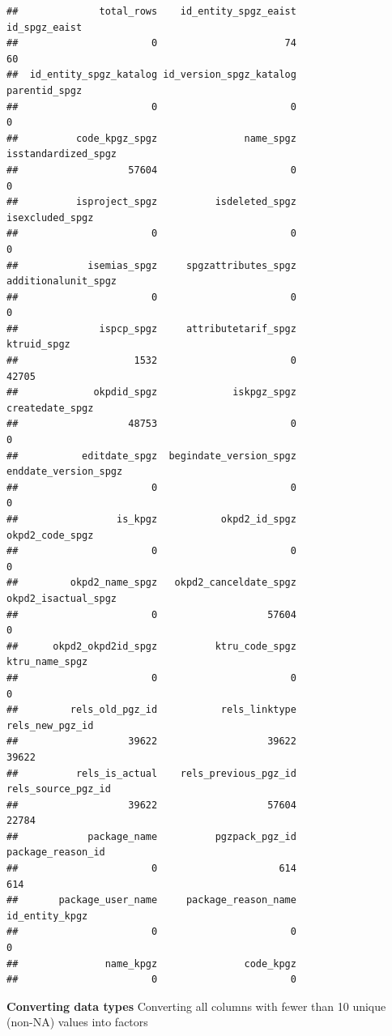 \documentclass[
]{article}
\begin{document}
\begin{verbatim}
##              total_rows    id_entity_spgz_eaist           id_spgz_eaist 
##                       0                      74                      60 
##  id_entity_spgz_katalog id_version_spgz_katalog           parentid_spgz 
##                       0                       0                       0 
##          code_kpgz_spgz               name_spgz     isstandardized_spgz 
##                   57604                       0                       0 
##          isproject_spgz          isdeleted_spgz         isexcluded_spgz 
##                       0                       0                       0 
##            isemias_spgz     spgzattributes_spgz     additionalunit_spgz 
##                       0                       0                       0 
##              ispcp_spgz     attributetarif_spgz             ktruid_spgz 
##                    1532                       0                   42705 
##             okpdid_spgz             iskpgz_spgz         createdate_spgz 
##                   48753                       0                       0 
##           editdate_spgz  begindate_version_spgz    enddate_version_spgz 
##                       0                       0                       0 
##                 is_kpgz           okpd2_id_spgz         okpd2_code_spgz 
##                       0                       0                       0 
##         okpd2_name_spgz   okpd2_canceldate_spgz     okpd2_isactual_spgz 
##                       0                   57604                       0 
##      okpd2_okpd2id_spgz          ktru_code_spgz          ktru_name_spgz 
##                       0                       0                       0 
##         rels_old_pgz_id           rels_linktype         rels_new_pgz_id 
##                   39622                   39622                   39622 
##          rels_is_actual    rels_previous_pgz_id      rels_source_pgz_id 
##                   39622                   57604                   22784 
##            package_name          pgzpack_pgz_id       package_reason_id 
##                       0                     614                     614 
##       package_user_name     package_reason_name          id_entity_kpgz 
##                       0                       0                       0 
##               name_kpgz               code_kpgz 
##                       0                       0
\end{verbatim}

\textbf{Converting data types} Converting all columns with fewer than 10
unique (non-NA) values into factors
\end{document}
